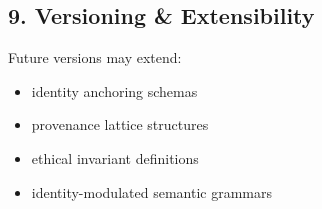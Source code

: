 \subsection{9. Versioning \& Extensibility}\label{versioning-extensibility}

Future versions may extend:

\begin{itemize}
\tightlist
\item
  identity anchoring schemas
\item
  provenance lattice structures
\item
  ethical invariant definitions
\item
  identity-modulated semantic grammars
\end{itemize}
